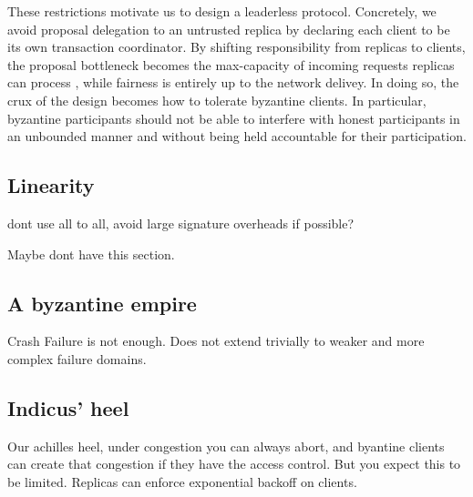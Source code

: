 These restrictions motivate us to design a leaderless protocol. Concretely, we avoid proposal delegation to an untrusted replica by declaring each client to be its own transaction coordinator.
By shifting responsibility from replicas to clients, the proposal bottleneck becomes the max-capacity of incoming requests replicas can process , while fairness is entirely up to the network delivey. In doing so, the crux of the design becomes how to tolerate byzantine clients. In particular, byzantine participants should not be able to interfere with honest participants in an unbounded manner and without being held accountable for their participation. 




\subsection{Linearity}
dont use all to all, avoid large signature overheads if possible?

Maybe dont have this section. 

\subsection{A byzantine empire}
Crash Failure is not enough. Does not extend trivially to weaker and more complex failure domains.

\subsection{Indicus' heel}
Our achilles heel, under congestion you can always abort, and byantine clients can create that congestion if they have the access control. But you expect this to be limited. 
Replicas can enforce exponential backoff on clients.